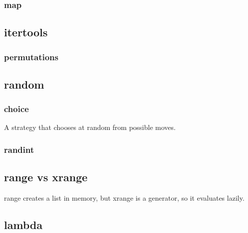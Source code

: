 \documentclass[12pt]{article}
\begin{document}
\subsubsection{map}





\subsection{itertools}

\subsubsection{permutations}





\subsection{random}


\subsubsection{choice}



A strategy that chooses at random from possible moves.




\subsubsection{randint}





\subsection{range vs xrange}

range creates a list in memory, but xrange is a generator, so it evaluates lazily.




\subsection{lambda}
\end{document}
